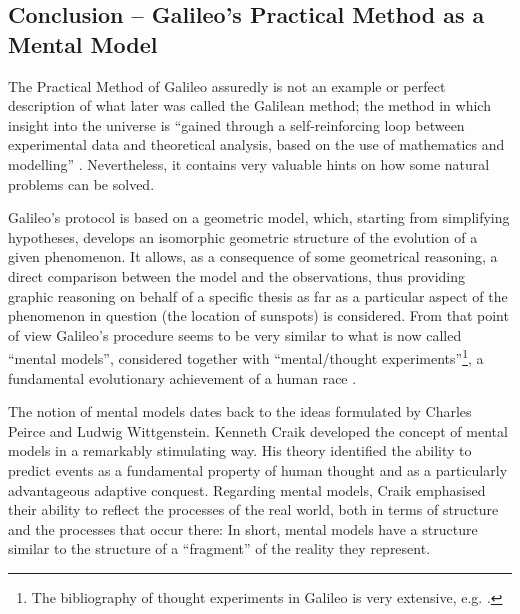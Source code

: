 \begin{artengenv}
\section{Conclusion -- Galileo’s Practical Method as a Mental Model}

The Practical Method of Galileo assuredly is not an example or perfect description of what later was called the
Galilean method; the method in which insight into the universe is ``gained through a self-reinforcing loop between
experimental data and theoretical analysis, based on the use of mathematics and modelling''
\parencite[p.2]{succi_big_2019}.
Nevertheless, it contains very valuable hints on how some
natural problems can be solved.

Galileo’s protocol is based on a geometric model, which, starting from simplifying hypotheses, develops an isomorphic
geometric structure of the evolution of a given phenomenon. It allows, as a consequence of some geometrical reasoning,
a direct comparison between the model and the observations, thus providing graphic reasoning on behalf of a specific
thesis as far as a particular aspect of the phenomenon in question (the location of sunspots) is considered. From that
point of view Galileo’s procedure seems to be very similar to what is now called ``mental models'', considered together
with ``mental/thought experiments''\footnote{The bibliography of thought experiments in Galileo is very extensive, e.g.
\parencite{camilleri_knowing_2015,palmerino_discussing_2018,palmieri_mental_2003}.
}, a fundamental evolutionary achievement
of a human race
\parencite[see][]{nersessian_theoreticians_1992,nersessian_creating_2008,stuart_routledge_2018}.

The notion of mental models dates back to the ideas formulated by Charles Peirce and Ludwig Wittgenstein. Kenneth Craik
developed the concept of mental models in a remarkably stimulating way. His theory identified the ability to predict
events as a fundamental property of human thought and as a particularly advantageous adaptive conquest. Regarding
mental models, Craik emphasised their ability to reflect the processes of the real world, both in terms of structure
and the processes that occur there:
In short, mental models have a structure similar to the structure of a ``fragment'' of the reality they
represent.


\end{artengenv}
